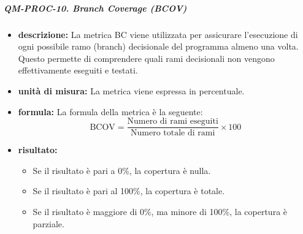                     \subparagraph{QM-PROC-10. Branch Coverage (BCOV)}

                    \begin{itemize}
                        
                        \item \textbf{descrizione: }
                            La metrica BC viene utilizzata per assicurare l'esecuzione di ogni possibile ramo (branch) decisionale del programma almeno una volta. Questo permette di comprendere quali rami decisionali non vengono effettivamente eseguiti e testati.

                        \item \textbf{unità di misura: }
                        La metrica viene espressa in percentuale.

                        \item \textbf{formula: }
                            La formula della metrica è la seguente:
                            \[
                                \text{BCOV} = \frac{\text{Numero di rami eseguiti}}{\text{Numero totale di rami}} \times 100
                            \]

                        \item \textbf{risultato: }
                        \begin{itemize}
                            \item Se il risultato è pari a 0\%, la copertura è nulla.
                            \item Se il risultato è pari al 100\%, la copertura è totale.
                            \item Se il risultato è maggiore di 0\%, ma minore di 100\%, la copertura è parziale.
                        \end{itemize}
                    \end{itemize}

